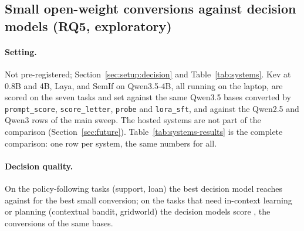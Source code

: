 \subsection{Small open-weight conversions against decision models (RQ5, exploratory)}
\label{sec:res:decision}

\paragraph{Setting.} Not pre-registered; Section~\ref{sec:setup:decision} and Table~\ref{tab:systems}. Kev at 0.8B and 4B, Laya, and SemIf on Qwen3.5-4B, all running on the laptop, are scored on the seven tasks and set against the same Qwen3.5 bases converted by \texttt{prompt\_score}, \texttt{score\_letter}, \texttt{probe} and \texttt{lora\_sft}, and against the Qwen2.5 and Qwen3 rows of the main sweep. The hosted systems are not part of the comparison (Section~\ref{sec:future}). Table~\ref{tab:systems-results} is the complete comparison: one row per system, the same numbers for all.

\begin{table}[t]
  \centering\small
  \caption{Complete comparison of decision models and open-weight conversions on the seven tasks: mean and worst normalized score, oracle agreement, calibration (ECE, Brier) of the probability assigned to the chosen action, latency per decision on the laptop (median and 95th percentile), tokens and parameters. Generated by \texttt{deadeye report} from \texttt{results/decision\_models} together with the main-sweep and LoRA runs.}
  \label{tab:systems-results}
\end{table}

\paragraph{Decision quality.} On the policy-following tasks (support, loan) the best decision model reaches  against \result{[\norm{}]} for the best small conversion; on the tasks that need in-context learning or planning (contextual bandit, gridworld) the decision models score \result{[\norm{}]},  the conversions of the same bases. 


